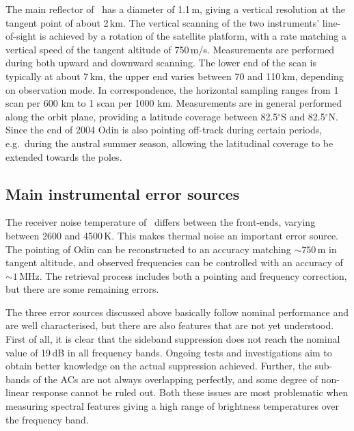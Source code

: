 The main reflector of \smr\ has a diameter of 1.1\,m, giving a
vertical resolution at the tangent point of about 2\,km. The vertical scanning
of the two instruments' line-of-sight is achieved by a rotation of the satellite
platform, with a rate matching a vertical speed of the tangent altitude of
750\,m/s. Measurements are performed during both upward and downward scanning.
The lower end of the scan is typically at about 7\,km, the upper end varies
between 70 and 110\,km, depending on observation mode. In correspondence,
the horizontal sampling ranges from 1 scan per 600 km to 1 scan per 1000 km.
Measurements are in general performed along the orbit plane, providing a
latitude coverage between 82.5$^{\circ}$S and 82.5$^{\circ}$N. Since the end of
2004 Odin is also pointing off-track during certain periods, e.g.\ during the
austral summer season, allowing the latitudinal coverage to be extended towards
the poles. 


\subsection{Main instrumental error sources}
\label{sec:smr:errors}
%
The receiver noise temperature of \smr\ differs between the front-ends, varying
between 2600 and 4500\,K. This makes thermal noise an important error source.
The pointing of Odin can be reconstructed to an accuracy matching $\sim 750$\,m
in tangent altitude, and observed frequencies can be controlled with an
accuracy of $\sim 1$\,MHz. The retrieval process includes both a pointing and
frequency correction, but there are some remaining errors.

The three error sources discussed above basically follow nominal performance
and are well characterised, but there are also features that are not yet
understood. First of all, it is clear that the sideband suppression does not
reach the nominal value of 19\,dB in all frequency bands. Ongoing tests and
investigations aim to obtain better knowledge on the actual suppression achieved.
Further, the sub-bands of the ACs are not always overlapping perfectly, and
some degree of non-linear response cannot be ruled out. Both these issues are
most problematic when measuring spectral features giving a high range of
brightness temperatures over the frequency band.

